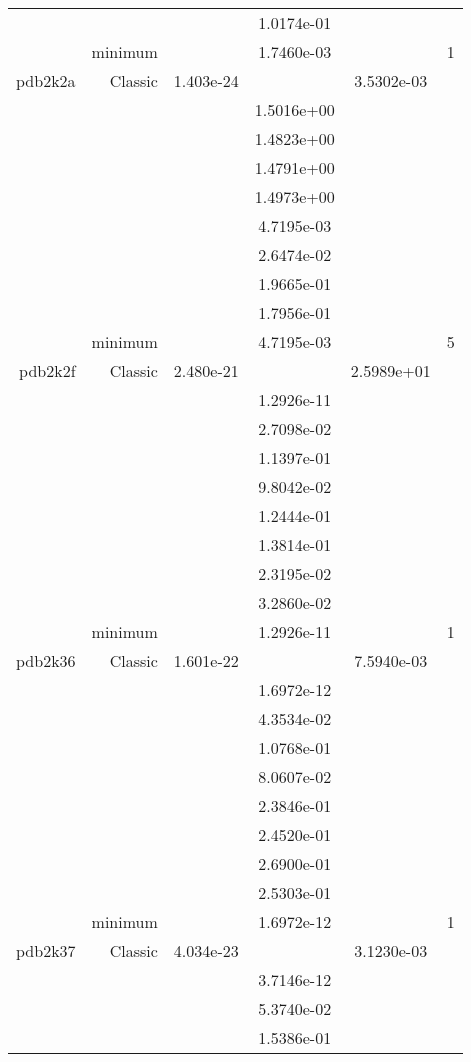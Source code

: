 \begin{xltabular}{\textwidth}{r|rS[table-format=1.3e+2]S[table-format=1.4e+2]S[table-format=1.4e+2]S[table-format=-1.5]}
&  &  & 1.0174e-01 & & \\
& minimum &  & 1.7460e-03 & & 1 \\  \addlinespace
pdb2k2a & Classic & 1.403e-24 &  & 3.5302e-03 & \\
&  &  & 1.5016e+00 & & \\
&  &  & 1.4823e+00 & & \\
&  &  & 1.4791e+00 & & \\
&  &  & 1.4973e+00 & & \\
&  &  & 4.7195e-03 & & \\
&  &  & 2.6474e-02 & & \\
&  &  & 1.9665e-01 & & \\
&  &  & 1.7956e-01 & & \\
& minimum &  & 4.7195e-03 & & 5 \\  \addlinespace
pdb2k2f & Classic & 2.480e-21 &  & 2.5989e+01 & \\
&  &  & 1.2926e-11 & & \\
&  &  & 2.7098e-02 & & \\
&  &  & 1.1397e-01 & & \\
&  &  & 9.8042e-02 & & \\
&  &  & 1.2444e-01 & & \\
&  &  & 1.3814e-01 & & \\
&  &  & 2.3195e-02 & & \\
&  &  & 3.2860e-02 & & \\
& minimum &  & 1.2926e-11 & & 1 \\  \addlinespace
pdb2k36 & Classic & 1.601e-22 &  & 7.5940e-03 & \\
&  &  & 1.6972e-12 & & \\
&  &  & 4.3534e-02 & & \\
&  &  & 1.0768e-01 & & \\
&  &  & 8.0607e-02 & & \\
&  &  & 2.3846e-01 & & \\
&  &  & 2.4520e-01 & & \\
&  &  & 2.6900e-01 & & \\
&  &  & 2.5303e-01 & & \\
& minimum &  & 1.6972e-12 & & 1 \\  \addlinespace
pdb2k37 & Classic & 4.034e-23 &  & 3.1230e-03 & \\
&  &  & 3.7146e-12 & & \\
&  &  & 5.3740e-02 & & \\
&  &  & 1.5386e-01 & & \\

\end{xltabular}
